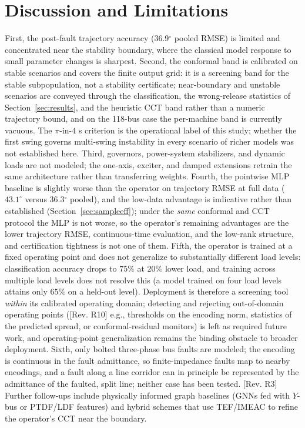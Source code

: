 \documentclass[5p,times]{elsarticle}
\newcommand{\rmsePost}{36.9}          %
\newcommand{\rmseAll}{36.3}           %
\begin{document}
\section{Discussion and Limitations}
\label{sec:discussion}
First, the post-fault trajectory accuracy (\rmsePost{}$^\circ$ pooled RMSE) is limited and
concentrated near the stability boundary, where the classical model response to small parameter
changes is sharpest. Second, the conformal band is calibrated on stable scenarios and covers the
finite output grid: it is a screening band for the stable subpopulation, not a stability
certificate; near-boundary and unstable scenarios are conveyed through the classification, the
wrong-release statistics of Section~\ref{sec:results}, and the heuristic CCT band rather than a
numeric trajectory bound, and on the 118-bus case the per-machine band is currently vacuous. The $\pi$-in-$4$ s criterion is the operational label of this study; whether the first
swing governs multi-swing instability in every scenario of richer models was not established
here. Third, governors, power-system stabilizers, and dynamic loads are not modeled; the one-axis,
exciter, and damped extensions retrain the same architecture rather than transferring weights. Fourth, the pointwise
MLP baseline is slightly worse than the operator on trajectory RMSE at full data
($43.1^\circ$ versus \rmseAll{}$^\circ$ pooled), and the low-data advantage is indicative rather
than established (Section~\ref{sec:sampleeff}); under the \emph{same} conformal and CCT protocol
the MLP is not worse, so the operator's remaining advantages are the lower trajectory RMSE,
continuous-time evaluation, and the low-rank structure, and certification tightness is not one of
them. Fifth, the operator is trained at a fixed operating point and does not generalize to
substantially different load levels: classification accuracy drops to $75\%$ at $20\%$ lower
load, and training across multiple load levels does not resolve this (a model trained on four
load levels attains only $65\%$ on a held-out level). Deployment is therefore a screening tool
\emph{within} its calibrated operating domain; detecting and rejecting out-of-domain operating
points ([Rev. R10] e.g., thresholds on the encoding norm, statistics of the predicted spread,
or conformal-residual monitors) is left as required future work, and
operating-point generalization remains the binding obstacle to broader deployment. Sixth, only bolted three-phase
bus faults are modeled; the encoding is continuous in the fault admittance, so finite-impedance
faults map to nearby encodings, and a fault along a line corridor can in principle be represented
by the admittance of the faulted, split line; neither case has been tested. [Rev. R3] Further
follow-ups include physically informed graph baselines (GNNs fed with $Y$-bus or PTDF/LDF
features) and hybrid schemes that use TEF/IMEAC to refine the operator's CCT near the boundary.
\end{document}
